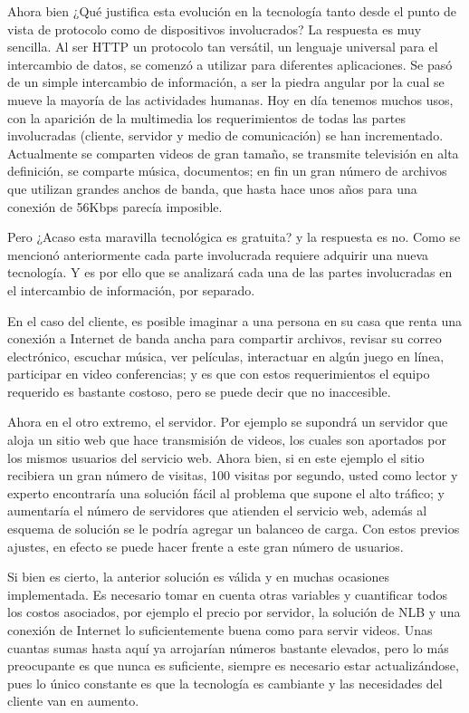 Ahora bien ¿Qué justifica esta evolución en la tecnología tanto desde el punto de vista de protocolo como de dispositivos involucrados? La respuesta es muy sencilla. Al ser HTTP un protocolo tan versátil, un lenguaje universal para el intercambio de datos, se comenzó a utilizar para diferentes aplicaciones. Se pasó de un simple intercambio de información, a ser la piedra angular por la cual se mueve la mayoría de las actividades humanas. Hoy en día tenemos muchos usos, con la aparición de la multimedia los requerimientos de todas las partes involucradas (cliente, servidor y medio de comunicación) se han incrementado. Actualmente se comparten videos de gran tamaño, se transmite televisión en alta definición, se comparte música, documentos; en fin un gran número de archivos que utilizan grandes anchos de banda, que hasta hace unos años para una conexión de 56Kbps parecía imposible.

Pero ¿Acaso esta maravilla tecnológica es gratuita? y la respuesta es no. Como se mencionó anteriormente cada parte involucrada requiere adquirir una nueva tecnología. Y es por ello que se analizará cada una de las partes involucradas en el intercambio de información, por separado. 

En el caso del cliente, es posible imaginar a una persona en su casa que renta una conexión a Internet de banda ancha para compartir archivos, revisar su correo electrónico, escuchar música, ver películas, interactuar en algún juego en línea, participar en video conferencias; y es que con estos requerimientos el equipo requerido es bastante costoso, pero se puede decir que no inaccesible. 

Ahora en el otro extremo, el servidor. Por ejemplo se supondrá un servidor que aloja un sitio web que hace transmisión de videos, los cuales son aportados por los mismos usuarios del servicio web. Ahora bien, si en este ejemplo el sitio recibiera un gran número de visitas, 100 visitas por segundo, usted como lector y experto encontraría una solución fácil al problema que supone el alto tráfico; y aumentaría el número de servidores que atienden el servicio web, además al esquema de solución se le podría agregar un balanceo de carga. Con estos previos ajustes, en efecto se puede hacer frente a este gran número de usuarios. 

Si bien es cierto, la anterior solución es válida y en muchas ocasiones implementada. Es necesario tomar en cuenta otras variables y cuantificar todos los costos asociados, por ejemplo el precio por servidor, la solución de NLB y una conexión de Internet lo suficientemente buena como para servir videos. Unas cuantas sumas hasta aquí ya arrojarían números bastante elevados, pero lo más preocupante es que nunca es suficiente, siempre es necesario estar actualizándose, pues lo único constante es que la tecnología es cambiante y las necesidades del cliente van en aumento. 

